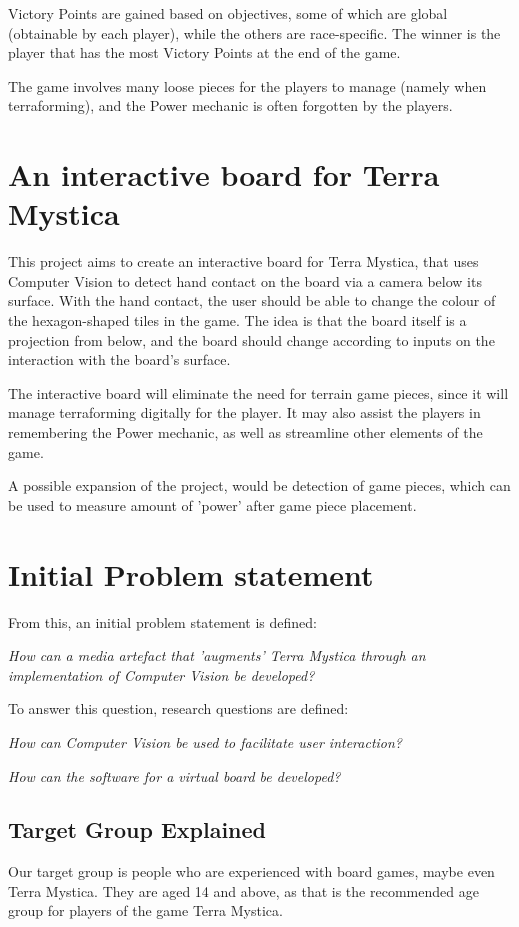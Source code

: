 Victory Points are gained based on objectives, some of which are global (obtainable by each player), while the others are race-specific. The winner is the player that has the most Victory Points at the end of the game.

The game involves many loose pieces for the players to manage (namely when terraforming), and the Power mechanic is often forgotten by the players.

\section{An interactive board for Terra Mystica}
This project aims to create an interactive board for Terra Mystica, that uses Computer Vision to detect hand contact on the board via a camera below its surface. With the hand contact, the user should be able to change the colour of the hexagon-shaped tiles in the game. The idea is that the board itself is a projection from below, and the board should change according to inputs on the interaction with the board's surface.

The interactive board will eliminate the need for terrain game pieces, since it will manage terraforming digitally for the player. It may also assist the players in remembering the Power mechanic, as well as streamline other elements of the game.

A possible expansion of the project, would be detection of game pieces, which can be used to measure amount of 'power' after game piece placement. 

\section{Initial Problem statement}
From this, an initial problem statement is defined: 

\textit{How can a media artefact that 'augments' Terra Mystica through an implementation of Computer Vision be developed?}

To answer this question, research questions are defined:

\textit{How can Computer Vision be used to facilitate user interaction?}

\textit{How can the software for a virtual board be developed?}

\subsection{Target Group Explained}
 Our target group is people who are experienced with board games, maybe even Terra Mystica. They are aged 14 and above, as that is the recommended age group for players of the game Terra Mystica.